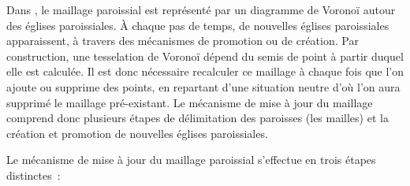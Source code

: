 \begin{tcolorbox}[breakable,left=0pt,right=0pt,top=0pt,bottom=0pt,
	colback=gray!15,colframe=gray!15,width=\dimexpr\textwidth\relax, 
	enlarge left by=0mm, boxsep=5pt,arc=0pt,outer arc=0pt]
	Dans \simfeodal{}, le maillage paroissial est représenté par un diagramme de Voronoï autour des églises paroissiales.
	À chaque pas de temps, de nouvelles églises paroissiales apparaissent, à travers des mécanismes de promotion ou de création.
	Par construction, une tesselation de Voronoï dépend du semis de point à partir duquel elle est calculée.
	Il est donc nécessaire recalculer ce maillage à chaque fois que l'on ajoute ou supprime des points, en repartant d'une situation \og neutre\fg{} d'où l'on aura supprimé le maillage pré-existant\footnotemark.
	Le mécanisme de \og mise à jour\fg{} du maillage comprend donc plusieurs étapes de délimitation des paroisses (les mailles) et la création et promotion de nouvelles églises paroissiales.
\end{tcolorbox}
	Le mécanisme de mise à jour du maillage paroissial s'effectue en trois étapes distinctes~:

